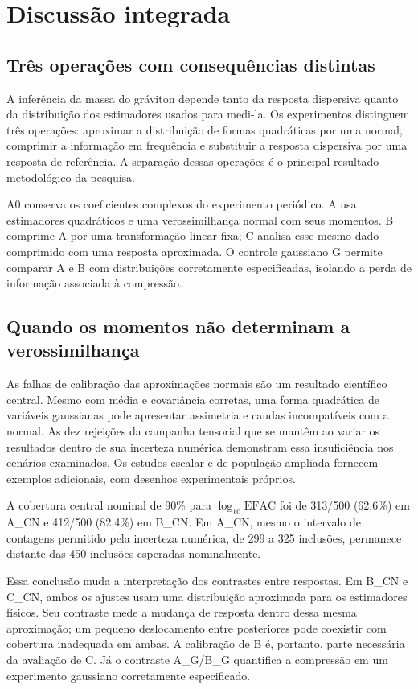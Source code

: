 \chapter{Discussão integrada}
\label{chap:discussao}

\section{Três operações com consequências distintas}

A inferência da massa do gráviton depende tanto da resposta dispersiva quanto da distribuição dos estimadores usados para medi-la. Os experimentos distinguem três operações: aproximar a distribuição de formas quadráticas por uma normal, comprimir a informação em frequência e substituir a resposta dispersiva por uma resposta de referência. A separação dessas operações é o principal resultado metodológico da pesquisa.

A0 conserva os coeficientes complexos do experimento periódico. A usa estimadores quadráticos e uma verossimilhança normal com seus momentos. B comprime A por uma transformação linear fixa; C analisa esse mesmo dado comprimido com uma resposta aproximada. O controle gaussiano G permite comparar A e B com distribuições corretamente especificadas, isolando a perda de informação associada à compressão.

\section{Quando os momentos não determinam a verossimilhança}

As falhas de calibração das aproximações normais são um resultado científico central. Mesmo com média e covariância corretas, uma forma quadrática de variáveis gaussianas pode apresentar assimetria e caudas incompatíveis com a normal. As dez rejeições da campanha tensorial que se mantêm ao variar os resultados dentro de sua incerteza numérica demonstram essa insuficiência nos cenários examinados. Os estudos escalar e de população ampliada fornecem exemplos adicionais, com desenhos experimentais próprios.

A cobertura central nominal de 90\% para $\log_{10}\mathrm{EFAC}$ foi de 313/500 (62,6\%) em A\_CN e 412/500 (82,4\%) em B\_CN. Em A\_CN, mesmo o intervalo de contagens permitido pela incerteza numérica, de 299 a 325 inclusões, permanece distante das 450 inclusões esperadas nominalmente.

Essa conclusão muda a interpretação dos contrastes entre respostas. Em B\_CN e C\_CN, ambos os ajustes usam uma distribuição aproximada para os estimadores físicos. Seu contraste mede a mudança de resposta dentro dessa mesma aproximação; um pequeno deslocamento entre posteriores pode coexistir com cobertura inadequada em ambas. A calibração de B é, portanto, parte necessária da avaliação de C. Já o contraste A\_G/B\_G quantifica a compressão em um experimento gaussiano corretamente especificado.

